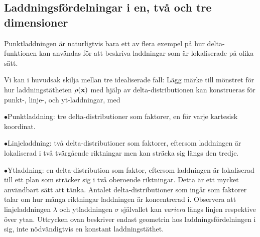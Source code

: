 \subsection{Laddningsf{\"o}rdelningar i en, tv{\aa} och tre dimensioner}
Punktladdningen {\"a}r naturligtvis bara ett av flera exempel p{\aa} hur
delta-funktionen kan anv{\"a}ndas f{\"o}r att beskriva laddningar som {\"a}r
lokaliserade p{\aa} olika s{\"a}tt.
\medskip
\centerline{%
  \hskip 30pt
  \hskip 30pt
}
\medskip
\noindent
Vi kan i huvudsak skilja mellan tre idealiserade fall:
\vfill\eject
\noindent
L{\"a}gg m{\"a}rke till m{\"o}nstret f{\"o}r hur laddningst{\"a}theten
$\rho({\bf x})$ med hj{\"a}lp av delta-distributionen kan konstrueras
f{\"o}r punkt-, linje-, och yt-laddningar, med
\medskip
\item{$\bullet$}{Punktladdning: tre delta-distributioner som faktorer, en
  f{\"o}r varje kartesisk koordinat.}
\item{$\bullet$}{Linjeladdning: tv{\aa} delta-distributioner som faktorer,
  eftersom laddningen {\"a}r lokaliserad i tv{\aa} tv{\"a}rg{\aa}ende
  riktningar men kan str{\"a}cka sig l{\"a}ngs den tredje.}
\item{$\bullet$}{Ytladdning: en delta-distribution som faktor, eftersom
  laddningen {\"a}r lokaliserad till ett plan som str{\"a}cker sig i tv{\aa}
  oberoende riktningar.}
\medskip
\noindent
Detta {\"a}r ett mycket anv{\"a}ndbart s{\"a}tt att t{\"a}nka. Antalet
delta-distributioner som ing{\aa}r som faktorer talar om hur m{\aa}nga
riktningar laddningen {\"a}r koncentrerad i. Observera att linjeladdningen
$\lambda$ och ytladdningen $\sigma$ sj{\"a}lvallet kan {\it variera} l{\"a}ngs
linjen respektive {\"o}ver ytan. Uttrycken ovan beskriver endast geometrin
hos laddningsf{\"o}rdelningen i sig, inte n{\"o}dv{\"a}ndigtvis en konstant
laddningst{\"a}thet.

